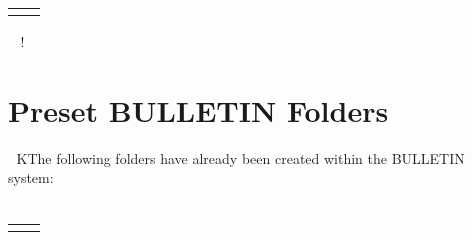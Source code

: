 \begin{tabular} {lp{3.0in}}
 \end{tabular}  \normalsize    ! \section{Preset BULLETIN Folders}    K The following folders have already been created within the BULLETIN system:  \smaller \\[8pt]  \begin{tabular} {lp{5.5in}} %

\end{tabular}
